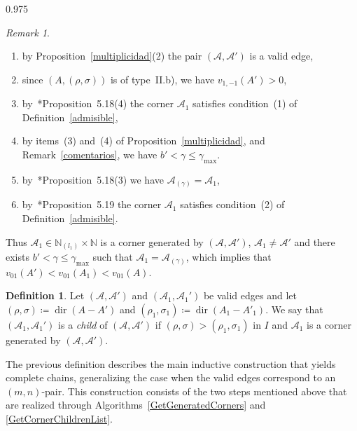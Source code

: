 \documentclass[reqno,a4paper,twoside]{amsart}
\theoremstyle{definition}
\newtheorem{definition}[theorem]{Definition}
\theoremstyle{remark}
\newtheorem{remark}[theorem]{Remark}
\DeclareMathOperator{\dir}{dir}
\begin{document}
\begin{spacing}{0.975}
\begin{remark}
\begin{enumerate}[itemsep=0.5ex,topsep=0.5ex]
\item by Proposition~\ref{multiplicidad}(2) the pair $(\mathcal{A},\mathcal{A}')$ is a valid edge,

\item since $(A,(\rho,\sigma))$ is of type~II.b), we have $v_{1,-1}(A')>0$,

\item by~\cite{GGV1}*{Proposition~5.18(4)} the corner $\mathcal{A}_1$ satisfies condition~(1) of Definition~\ref{admisible},

\item by items~(3) and~(4) of Proposition~\ref{multiplicidad}, and Remark~\ref{comentarios}, we have $b'<\gamma\le\gamma_{\max}$. %

\item by~\cite{GGV1}*{Proposition~5.18(3)} we have $\mathcal{A}_{(\gamma)} = \mathcal{A}_1$,

\item by~\cite{GGV1}*{Proposition~5.19} the corner $\mathcal{A}_1$ satisfies condition~(2) of Definition~\ref{admisible}.

\end{enumerate}
Thus $\mathcal{A}_1\in \mathds{N}_{\!(l_1)}\times \mathds{N}$ is a corner generated by $(\mathcal{A},\mathcal{A}')$, $\mathcal{A}_1\ne \mathcal{A}'$ and there exists $b'  < \gamma\le \gamma_{\max}$ such that $\mathcal{A}_1 = \mathcal{A}_{(\gamma)}$, which implies that $v_{01}(A')< v_{01}(A_1)< v_{01}(A)$.
\end{remark}

\begin{definition}\label{child}
Let $(\mathcal{A},\mathcal{A}')$ and $(\mathcal{A}_1,\mathcal{A}_1')$ be valid edges and let $(\rho,\sigma)\coloneqq \dir(A - A')$ and $(\rho_1,\sigma_1)\coloneqq \dir(A_1 - A'_1)$.  We say that $(\mathcal{A}_1,\mathcal{A}_1')$ is a {\em child} of $(\mathcal{A},\mathcal{A}')$ if $(\rho,\sigma)>(\rho_1,\sigma_1)$ in $I$ and $\mathcal{A}_1$ is a corner generated by $(\mathcal{A},\mathcal{A}')$.
\end{definition}

The previous definition describes the main inductive construction that yields complete chains, generalizing the case when the valid edges correspond to an $(m,n)$-pair. This construction consists of the two steps mentioned above that are realized through Algorithms~\ref{GetGeneratedCorners} and \ref{GetCornerChildrenList}.


\end{spacing}
\end{document}
